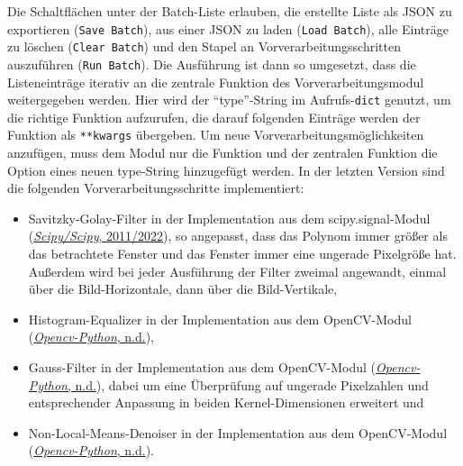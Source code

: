 \documentclass[
  12pt,
  openany]{book}
\begin{document}
Die Schaltflächen unter der Batch-Liste erlauben, die erstellte Liste als JSON zu exportieren (\texttt{Save\ Batch}), aus einer JSON zu laden (\texttt{Load\ Batch}), alle Einträge zu löschen (\texttt{Clear\ Batch}) und den Stapel an Vorverarbeitungsschritten auszuführen (\texttt{Run\ Batch}).
Die Ausführung ist dann so umgesetzt, dass die Listeneinträge iterativ an die zentrale Funktion des Vorverarbeitungsmodul weitergegeben werden. Hier wird der ``type''-String im Aufrufs-\texttt{dict} genutzt, um die richtige Funktion aufzurufen, die darauf folgenden Einträge werden der Funktion als \texttt{**kwargs} übergeben. Um neue Vorverarbeitungsmöglichkeiten anzufügen, muss dem Modul nur die Funktion und der zentralen Funktion die Option eines neuen type-String hinzugefügt werden.
In der letzten Version sind die folgenden Vorverarbeitungsschritte implementiert:

\begin{itemize}
\item
  Savitzky-Golay-Filter in der Implementation aus dem scipy.signal-Modul (\protect\hyperlink{ref-ScipyScipy2022}{\emph{Scipy/Scipy}, 2011/2022}), so angepasst, dass das Polynom immer größer als das betrachtete Fenster und das Fenster immer eine ungerade Pixelgröße hat. Außerdem wird bei jeder Ausführung der Filter zweimal angewandt, einmal über die Bild-Horizontale, dann über die Bild-Vertikale,
\item
  Histogram-Equalizer in der Implementation aus dem OpenCV-Modul (\protect\hyperlink{ref-OpencvpythonWrapperPackage}{\emph{Opencv-Python}, n.d.}),
\item
  Gauss-Filter in der Implementation aus dem OpenCV-Modul (\protect\hyperlink{ref-OpencvpythonWrapperPackage}{\emph{Opencv-Python}, n.d.}), dabei um eine Überprüfung auf ungerade Pixelzahlen und entsprechender Anpassung in beiden Kernel-Dimensionen erweitert und
\item
  Non-Local-Means-Denoiser in der Implementation aus dem OpenCV-Modul (\protect\hyperlink{ref-OpencvpythonWrapperPackage}{\emph{Opencv-Python}, n.d.}).
\end{itemize}
\end{document}
